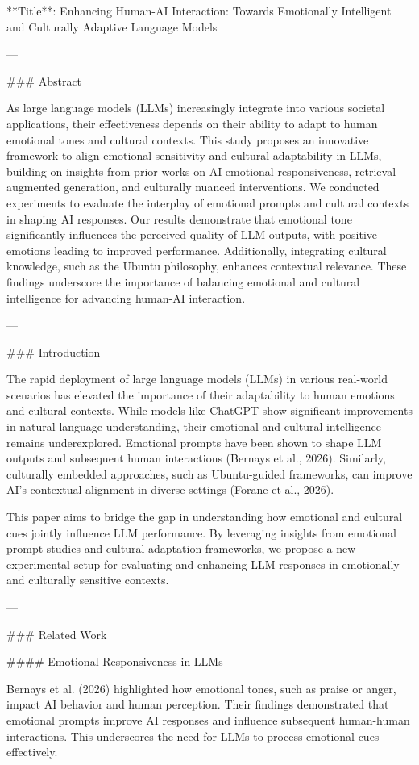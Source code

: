 **Title**: Enhancing Human-AI Interaction: Towards Emotionally Intelligent and Culturally Adaptive Language Models

---

### Abstract

As large language models (LLMs) increasingly integrate into various societal applications, their effectiveness depends on their ability to adapt to human emotional tones and cultural contexts. This study proposes an innovative framework to align emotional sensitivity and cultural adaptability in LLMs, building on insights from prior works on AI emotional responsiveness, retrieval-augmented generation, and culturally nuanced interventions. We conducted experiments to evaluate the interplay of emotional prompts and cultural contexts in shaping AI responses. Our results demonstrate that emotional tone significantly influences the perceived quality of LLM outputs, with positive emotions leading to improved performance. Additionally, integrating cultural knowledge, such as the Ubuntu philosophy, enhances contextual relevance. These findings underscore the importance of balancing emotional and cultural intelligence for advancing human-AI interaction.  

---

### Introduction

The rapid deployment of large language models (LLMs) in various real-world scenarios has elevated the importance of their adaptability to human emotions and cultural contexts. While models like ChatGPT show significant improvements in natural language understanding, their emotional and cultural intelligence remains underexplored. Emotional prompts have been shown to shape LLM outputs and subsequent human interactions (Bernays et al., 2026). Similarly, culturally embedded approaches, such as Ubuntu-guided frameworks, can improve AI's contextual alignment in diverse settings (Forane et al., 2026).

This paper aims to bridge the gap in understanding how emotional and cultural cues jointly influence LLM performance. By leveraging insights from emotional prompt studies and cultural adaptation frameworks, we propose a new experimental setup for evaluating and enhancing LLM responses in emotionally and culturally sensitive contexts.

---

### Related Work  

#### Emotional Responsiveness in LLMs

Bernays et al. (2026) highlighted how emotional tones, such as praise or anger, impact AI behavior and human perception. Their findings demonstrated that emotional prompts improve AI responses and influence subsequent human-human interactions. This underscores the need for LLMs to process emotional cues effectively.

